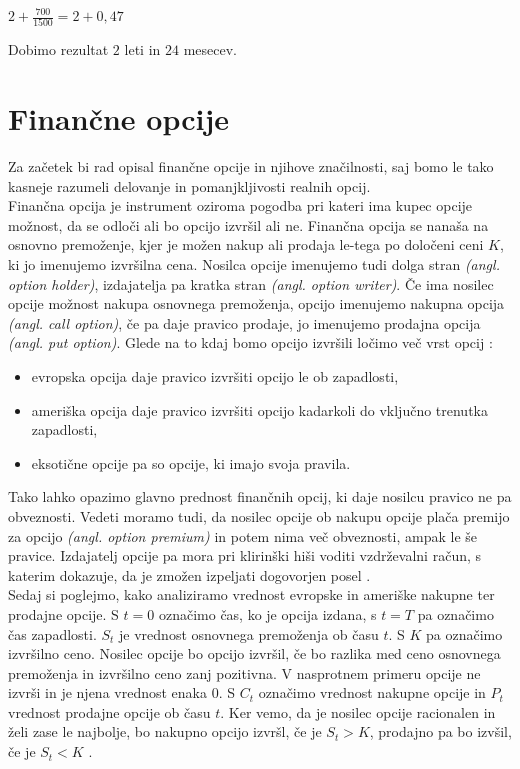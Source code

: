 \begin{center}
$2 + \tfrac{700}{1500} = 2 + 0,47$
\end{center}
Dobimo rezultat $2$ leti in $24$ mesecev.\\


\section{Finančne opcije}
Za začetek bi rad opisal finančne opcije in njihove značilnosti, saj bomo le tako kasneje razumeli delovanje in pomanjkljivosti realnih opcij.\\

Finančna opcija je instrument oziroma pogodba pri kateri ima kupec opcije možnost, da se odloči ali bo opcijo izvršil ali ne. Finančna opcija se nanaša na osnovno premoženje, kjer je možen nakup ali prodaja le-tega po določeni ceni $K$, ki jo imenujemo izvršilna cena. Nosilca opcije imenujemo tudi dolga stran \textit{(angl. option holder)}, izdajatelja pa kratka stran \textit{(angl. option writer)}. Če ima nosilec opcije možnost nakupa osnovnega premoženja, opcijo imenujemo nakupna opcija \textit{(angl. call option)}, če pa daje pravico prodaje, jo imenujemo prodajna opcija \textit{(angl. put option)}. Glede na to kdaj bomo opcijo izvršili ločimo več vrst opcij \cite[str. 53, 54 ]{Kosir}:
\begin{itemize}
\item evropska opcija daje pravico izvršiti opcijo le ob zapadlosti,
\item ameriška opcija daje pravico izvršiti opcijo kadarkoli do vključno trenutka zapadlosti,
\item eksotične opcije pa so opcije, ki imajo svoja pravila.
\end{itemize}
Tako lahko opazimo glavno prednost finančnih opcij, ki daje nosilcu pravico ne pa obveznosti. Vedeti moramo tudi, da nosilec opcije ob nakupu opcije plača premijo za opcijo \textit{(angl. option premium)} in potem nima več obveznosti, ampak le še pravice. Izdajatelj opcije pa mora pri klirinški hiši voditi vzdrževalni račun, s katerim dokazuje, da je zmožen izpeljati dogovorjen posel \cite[str. 54]{Kosir}.\\

Sedaj si poglejmo, kako analiziramo vrednost evropske in ameriške nakupne ter prodajne opcije. S $t=0$ označimo čas, ko je opcija izdana, s $t=T$ pa označimo čas zapadlosti. $S_t$ je vrednost osnovnega premoženja ob času $t$. S $K$ pa označimo izvršilno ceno. Nosilec opcije bo opcijo izvršil, če bo razlika med ceno osnovnega premoženja in izvršilno ceno zanj pozitivna. V nasprotnem primeru opcije ne izvrši in je njena vrednost enaka $0$. S $C_t$ označimo vrednost nakupne opcije in $P_t$ vrednost prodajne opcije ob času $t$. Ker vemo, da je nosilec opcije racionalen in želi zase le najbolje, bo nakupno opcijo izvršl, če je $S_t > K$, prodajno pa bo izvšil, če je $S_t < K$ \cite[str. 54-58]{Kosir}.\\

